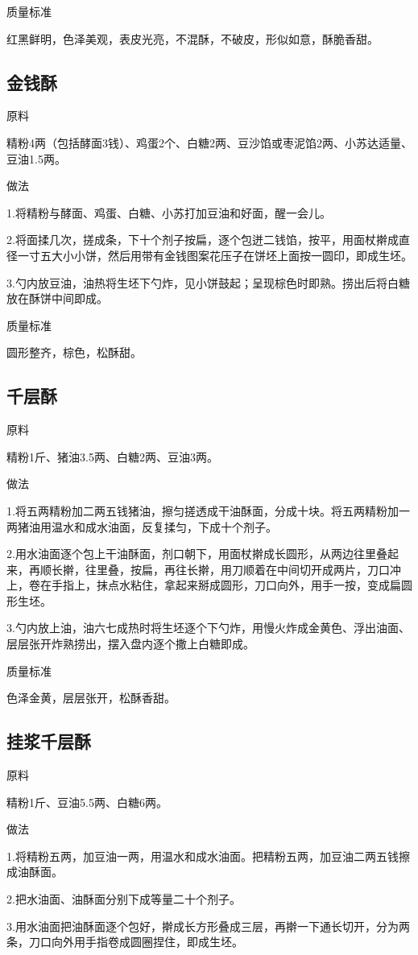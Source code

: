 \documentclass{ctexbook}
\begin{document}
质量标准

红黑鲜明，色泽美观，表皮光亮，不混酥，不破皮，形似如意，酥脆香甜。
\subsection{金钱酥}
原料

精粉4两（包括酵面3钱）、鸡蛋2个、白糖2两、豆沙馅或枣泥馅2两、小苏达适量、豆油1.5两。

做法

1.将精粉与酵面、鸡蛋、白糖、小苏打加豆油和好面，醒一会儿。

2.将面揉几次，搓成条，下十个剂子按扁，逐个包迸二钱馅，按平，用面杖擀成直径一寸五大小小饼，然后用带有金钱图案花压子在饼坯上面按一圆印，即成生坯。

3.勺内放豆油，油热将生坯下勺炸，见小饼鼓起；呈现棕色时即熟。捞出后将白糖放在酥饼中间即成。

质量标准

圆形整齐，棕色，松酥甜。
\subsection{千层酥}
原料

精粉1斤、猪油3.5两、白糖2两、豆油3两。

做法

1.将五两精粉加二两五钱猪油，擦匀搓透成干油酥面，分成十块。将五两精粉加一两猪油用温水和成水油面，反复揉匀，下成十个剂子。

2.用水油面逐个包上干油酥面，剂口朝下，用面杖擀成长圆形，从两边往里叠起来，再顺长擀，往里叠，按扁，再往长擀，用刀顺着在中间切开成两片，刀口冲上，卷在手指上，抹点水粘住，拿起来掰成圆形，刀口向外，用手一按，变成扁圆形生坯。

3.勺内放上油，油六七成热时将生坯逐个下勺炸，用慢火炸成金黄色、浮出油面、层层张开炸熟捞出，摆入盘内逐个撒上白糖即成。

质量标准

色泽金黄，层层张开，松酥香甜。
\subsection{挂浆千层酥}
原料

精粉1斤、豆油5.5两、白糖6两。

做法

1.将精粉五两，加豆油一两，用温水和成水油面。把精粉五两，加豆油二两五钱擦成油酥面。

2.把水油面、油酥面分别下成等量二十个剂子。

3.用水油面把油酥面逐个包好，擀成长方形叠成三层，再擀一下通长切开，分为两条，刀口向外用手指卷成圆圈捏住，即成生坯。
\end{document}
